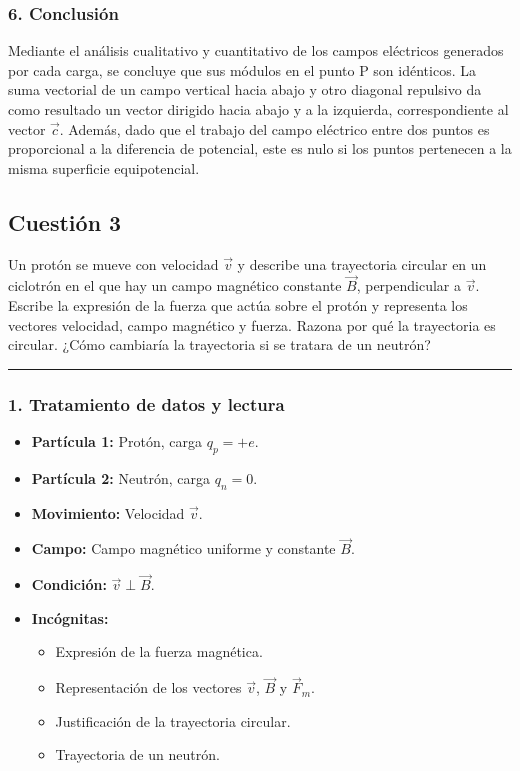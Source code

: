 \subsubsection*{6. Conclusión}
\begin{cajaconclusion}
Mediante el análisis cualitativo y cuantitativo de los campos eléctricos generados por cada carga, se concluye que sus módulos en el punto P son idénticos. La suma vectorial de un campo vertical hacia abajo y otro diagonal repulsivo da como resultado un vector dirigido hacia abajo y a la izquierda, correspondiente al vector $\vec{c}$. Además, dado que el trabajo del campo eléctrico entre dos puntos es proporcional a la diferencia de potencial, este es nulo si los puntos pertenecen a la misma superficie equipotencial.
\end{cajaconclusion}

\newpage

\subsection{Cuestión 3}
\label{subsec:C3_2023_jul_ord}

\begin{cajaenunciado}
Un protón se mueve con velocidad $\vec{v}$ y describe una trayectoria circular en un ciclotrón en el que hay un campo magnético constante $\vec{B}$, perpendicular a $\vec{v}$. Escribe la expresión de la fuerza que actúa sobre el protón y representa los vectores velocidad, campo magnético y fuerza. Razona por qué la trayectoria es circular. ¿Cómo cambiaría la trayectoria si se tratara de un neutrón?
\end{cajaenunciado}
\hrule

\subsubsection*{1. Tratamiento de datos y lectura}
\begin{itemize}
    \item \textbf{Partícula 1:} Protón, carga $q_p = +e$.
    \item \textbf{Partícula 2:} Neutrón, carga $q_n = 0$.
    \item \textbf{Movimiento:} Velocidad $\vec{v}$.
    \item \textbf{Campo:} Campo magnético uniforme y constante $\vec{B}$.
    \item \textbf{Condición:} $\vec{v} \perp \vec{B}$.
    \item \textbf{Incógnitas:}
    \begin{itemize}
        \item Expresión de la fuerza magnética.
        \item Representación de los vectores $\vec{v}$, $\vec{B}$ y $\vec{F}_m$.
        \item Justificación de la trayectoria circular.
        \item Trayectoria de un neutrón.
    \end{itemize}
\end{itemize}

